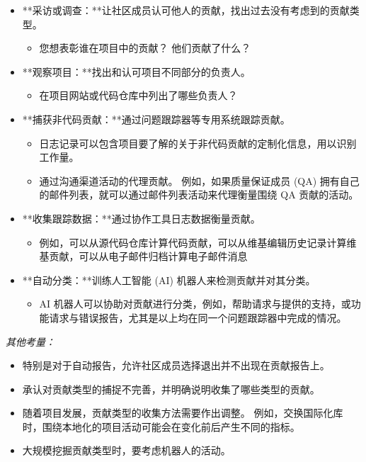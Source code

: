 \begin{itemize}
\item
  **采访或调查：**让社区成员认可他人的贡献，找出过去没有考虑到的贡献类型。

  \begin{itemize}
  \tightlist
  \item
    您想表彰谁在项目中的贡献？ 他们贡献了什么？
  \end{itemize}
\item
  **观察项目：**找出和认可项目不同部分的负责人。

  \begin{itemize}
  \tightlist
  \item
    在项目网站或代码仓库中列出了哪些负责人？
  \end{itemize}
\item
  **捕获非代码贡献：**通过问题跟踪器等专用系统跟踪贡献。

  \begin{itemize}
  \tightlist
  \item
    日志记录可以包含项目要了解的关于非代码贡献的定制化信息，用以识别工作量。
  \item
    通过沟通渠道活动的代理贡献。 例如，如果质量保证成员 (QA)
    拥有自己的邮件列表，就可以通过邮件列表活动来代理衡量围绕 QA
    贡献的活动。
  \end{itemize}
\item
  **收集跟踪数据：**通过协作工具日志数据衡量贡献。

  \begin{itemize}
  \tightlist
  \item
    例如，可以从源代码仓库计算代码贡献，可以从维基编辑历史记录计算维基贡献，可以从电子邮件归档计算电子邮件消息
  \end{itemize}
\item
  **自动分类：**训练人工智能 (AI) 机器人来检测贡献并对其分类。

  \begin{itemize}
  \tightlist
  \item
    AI
    机器人可以协助对贡献进行分类，例如，帮助请求与提供的支持，或功能请求与错误报告，尤其是以上均在同一个问题跟踪器中完成的情况。
  \end{itemize}
\end{itemize}

\emph{其他考量：}

\begin{itemize}
\tightlist
\item
  特别是对于自动报告，允许社区成员选择退出并不出现在贡献报告上。
\item
  承认对贡献类型的捕捉不完善，并明确说明收集了哪些类型的贡献。
\item
  随着项目发展，贡献类型的收集方法需要作出调整。
  例如，交换国际化库时，围绕本地化的项目活动可能会在变化前后产生不同的指标。
\item
  大规模挖掘贡献类型时，要考虑机器人的活动。
\end{itemize}


